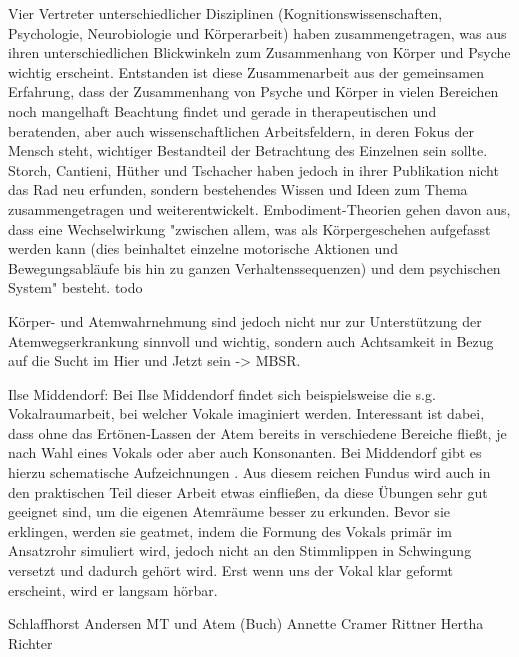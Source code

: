 Vier Vertreter unterschiedlicher Disziplinen (Kognitionswissenschaften, Psychologie, Neurobiologie und Körperarbeit) haben zusammengetragen, was aus ihren unterschiedlichen Blickwinkeln zum Zusammenhang von Körper und Psyche wichtig erscheint. Entstanden ist diese Zusammenarbeit aus der gemeinsamen Erfahrung, dass der Zusammenhang von Psyche und Körper in vielen Bereichen noch mangelhaft Beachtung findet und gerade in therapeutischen und beratenden, aber auch wissenschaftlichen Arbeitsfeldern, in deren Fokus der Mensch steht, wichtiger Bestandteil der Betrachtung des Einzelnen sein sollte.
Storch, Cantieni, Hüther und Tschacher haben jedoch in ihrer Publikation nicht das Rad neu erfunden, sondern bestehendes Wissen und Ideen zum Thema zusammengetragen und weiterentwickelt. Embodiment-Theorien gehen davon aus, dass eine Wechselwirkung "zwischen allem, was als Körpergeschehen aufgefasst werden kann (dies beinhaltet einzelne motorische Aktionen und Bewegungsabläufe bis hin zu ganzen Verhaltenssequenzen) und dem psychischen System" \autocite[39]{hüther2010} besteht. todo

Körper- und Atemwahrnehmung sind jedoch nicht nur zur Unterstützung der Atemwegserkrankung sinnvoll und wichtig, sondern auch Achtsamkeit in Bezug auf die Sucht im Hier und Jetzt sein -> MBSR.

Ilse Middendorf: Bei Ilse Middendorf findet sich beispielsweise die s.g. Vokalraumarbeit, bei welcher Vokale imaginiert werden. Interessant ist dabei, dass ohne das Ertönen-Lassen der Atem bereits in verschiedene Bereiche fließt, je nach Wahl eines Vokals oder aber auch Konsonanten. Bei Middendorf gibt es hierzu schematische Aufzeichnungen \autocite[vgl.][60ff.]{middendorf1995}. Aus diesem reichen Fundus wird auch in den praktischen Teil dieser Arbeit etwas einfließen, da diese Übungen sehr gut geeignet sind, um die eigenen Atemräume besser zu erkunden. Bevor sie erklingen, werden sie geatmet, indem die Formung des Vokals primär im Ansatzrohr simuliert wird, jedoch nicht an den Stimmlippen in Schwingung versetzt und dadurch gehört wird. Erst wenn uns der Vokal klar geformt erscheint, wird er langsam hörbar. 

Schlaffhorst Andersen
MT und Atem (Buch)
Annette Cramer
Rittner
Hertha Richter

